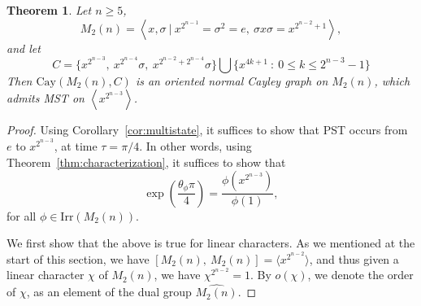 \documentclass{amsart}
\theoremstyle{plain}
\newtheorem{theorem}{Theorem}[section]
\theoremstyle{remark}\newtheorem{con}[theorem]{Construction}
\theoremstyle{remark} \newtheorem*{remark}{Remark}
\theoremstyle{remark} \newtheorem{example}{Example}
\newcommand{\mrm}{\mathrm}
\newcommand{\irr}{\mathrm{Irr}}
\begin{document}
\begin{theorem}\label{thm:mm-c}
 Let $n\geq 5$, \[M_{2}(n) =\left\langle x,\sigma\ \lvert \ x^{2^{n-1}}=\sigma^2=e,\ \sigma x \sigma =x^{2^{n-2}+1} \right\rangle, \]
and let 
\[ C= \{x^{2^{n-3}},\ x^{2^{n-4}}\sigma,\ x^{2^{n-2}+2^{n-4}}\sigma \} \bigcup \{x^{4k+1}\ :\ 0\leq k \leq 2^{n-3}-1 \}\]
 Then $\mrm{Cay}(M_{2}(n), C)$ is an oriented normal Cayley graph on $M_{2}(n)$, which admits MST on $\left\langle x^{2^{n-3}} \right\rangle$.   
\end{theorem}
\begin{proof}
Using Corollary~\ref{cor:multistate}, it suffices to show that PST occurs from $e$ to $x^{2^{n-3}}$, at time $\tau =\pi/4$. In other words, using Theorem~\ref{thm:characterization}, it suffices to show that
\begin{equation}\label{eq:mmcchar}
\exp\left(\dfrac{\theta_{\phi}\pi}{4} \right) = \dfrac{\phi(x^{2^{n-3}})}{\phi(1)},
\end{equation}
for all $\phi \in \irr(M_{2}(n))$.

We first show that the  above is true for linear characters. As we mentioned at the start of this section, we have  $[M_{2}(n),\ M_{2}(n)] =\langle x^{2^{n-2}}\rangle$, and thus given a linear character $\chi$ of $M_{2}(n)$, we have $\chi^{2^{n-2}}=1$. By $o(\chi)$, we denote the order of $\chi$, as an element of the dual group $\widehat{M_{2}(n)}$.  


\end{proof}
\end{document}
